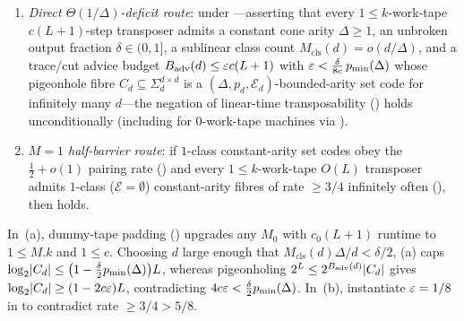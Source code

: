\begin{theorem}[Conditional closures of $(\T)$ from periodic sweep extraction or the $M=1$ half-barrier]\label{thm:conditional-tcc}
\begin{enumerate}[label=(\alph*)]
\item \emph{Direct $\Theta(1/\Delta)$-deficit route}: under
  ---asserting that every $1 \le k$-work-tape $c(L+1)$-step
  transposer admits a constant cone arity $\Delta \ge 1$, an unbroken output fraction
  $\delta \in (0,1]$, a sublinear class count $M_{\mathrm{cls}}(d) = o(d/\Delta)$, and a trace/cut
  advice budget $B_{\mathrm{adv}}(d) \le \varepsilon c (L + 1)$ with
  $\varepsilon < \frac{\delta}{8c}\,p_{\min}(\Delta)$ whose pigeonhole fibre $C_d \subseteq \Sigma_d^{d\times d}$
  is a $(\Delta, p_d, \mathcal{E}_d)$-bounded-arity set code for infinitely many $d$---the negation
  of linear-time transposability () holds unconditionally
  (including for $0$-work-tape machines via ).
\item \emph{$M = 1$ half-barrier route}: if $1$-class constant-arity set codes obey the
  $\frac{1}{2} + o(1)$ pairing rate () and every
  $1 \le k$-work-tape $O(L)$ transposer admits $1$-class ($\mathcal{E} = \emptyset$) constant-arity
  fibres of rate $\ge 3/4$ infinitely often (), then
   holds.
\end{enumerate}
\end{theorem}
\begin{outline}
In~(a), dummy-tape padding () upgrades any $M_0$ with $c_0(L+1)$ runtime to
$1 \le M.k$ and $1 \le c$. Choosing $d$ large enough that $M_{\mathrm{cls}}(d)\Delta/d < \delta/2$,
(a) caps $\log_2\lvert C_d \rvert \le \bigl(1 - \frac{\delta}{2}p_{\min}(\Delta)\bigr)L$,
whereas pigeonholing $2^L \le 2^{B_{\mathrm{adv}}(d)}\lvert C_d \rvert$ gives
$\log_2\lvert C_d \rvert \ge (1 - 2c\varepsilon)L$, contradicting $4c\varepsilon < \frac{\delta}{2}p_{\min}(\Delta)$.
In~(b), instantiate $\varepsilon = 1/8$ in  to contradict
rate $\ge 3/4 > 5/8$.
\end{outline}


